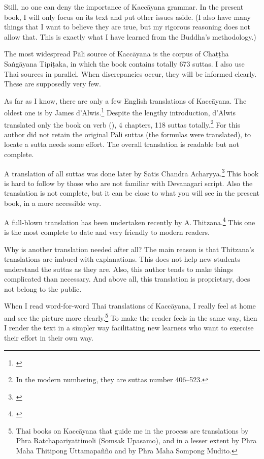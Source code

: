 Still, no one can deny the importance of Kaccāyana grammar. In the present book, I will only focus on its text and put other issues aside. (I also have many things that I want to believe they are true, but my rigorous reasoning does not allow that. This is exactly what I have learned from the Buddha's methodology.) 

The most widespread Pāli source of Kaccāyana is the corpus of Chaṭṭha Saṅgāyana Tipiṭaka, in which the book contains totally 673 suttas. I also use Thai sources in parallel. When discrepancies occur, they will be informed clearly. These are supposedly very few.

As far as I know, there are only a few English translations of Kaccāyana. The oldest one is by James d'Alwis.\footnote{\citealp{dalwis:kach}} Despite the lengthy introduction, d'Alwis translated only the book on verb (), 4 chapters, 118 suttas totally.\footnote{In the modern numbering, they are suttas number 406--523.} For this author did not retain the original Pāli suttas (the formulas were translated), to locate a sutta needs some effort. The overall translation is readable but not complete.

A translation of all suttas was done later by Satis Chandra Acharyya.\footnote{\citealp{satis:kacc}} This book is hard to follow by those who are not familiar with Devanagari script. Also the translation is not complete, but it can be close to what you will see in the present book, in a more accessible way.

A full-blown translation has been undertaken recently by A.\,Thitzana.\footnote{\citealp{thitzana:kacc2}} This one is the most complete to date and very friendly to modern readers.

Why is another translation needed after all? The main reason is that Thitzana's translations are imbued with explanations. This does not help new students understand the suttas as they are. Also, this author tends to make things complicated than necessary. And above all, this translation is proprietary, does not belong to the public.

When I read word-for-word Thai translations of Kaccāyana, I really feel at home and see the picture more clearly.\footnote{Thai books on Kaccāyana that guide me in the process are translations by Phra Ratchapariyattimoli (Somsak Upasamo), and in a lesser extent by Phra Maha Thitipong Uttamapañño and by Phra Maha Sompong Mudito.} To make the reader feels in the same way, then I render the text in a simpler way facilitating new learners who want to exercise their effort in their own way.

